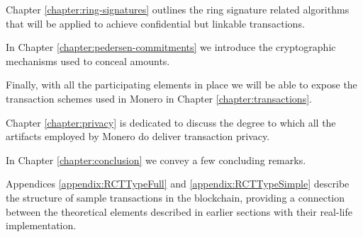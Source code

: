 Chapter \ref{chapter:ring-signatures} outlines the ring signature related algorithms that will be applied to achieve
confidential but linkable transactions.

In Chapter \ref{chapter:pedersen-commitments} we introduce the cryptographic mechanisms used to conceal amounts.

Finally, with all the participating elements in place we will be able to expose the transaction
schemes used in Monero in Chapter \ref{chapter:transactions}.

Chapter \ref{chapter:privacy} is dedicated to discuss the degree to which all the artifacts employed by Monero
do deliver transaction privacy.


In Chapter \ref{chapter:conclusion} we convey a few concluding remarks.

Appendices \ref{appendix:RCTTypeFull} and \ref{appendix:RCTTypeSimple} describe the structure of sample
transactions in the blockchain, providing a connection between the theoretical elements described in earlier sections with 
their real-life implementation.







